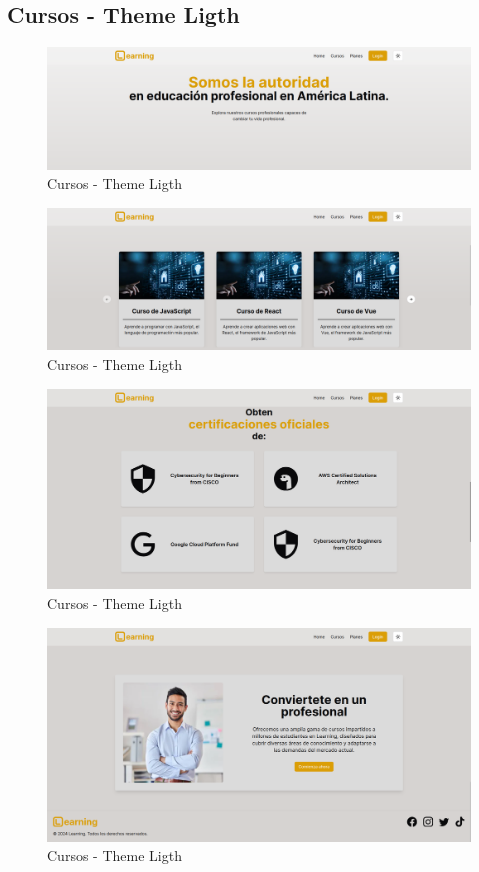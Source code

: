 \subsection{Cursos - Theme Ligth}
  \begin{figure}[H]
    \centering
    \includegraphics[width=1.0\textwidth]{img/C-L1.png}
    \caption{Cursos - Theme Ligth}
  \end{figure}
  \begin{figure}[H]
    \centering
    \includegraphics[width=1.0\textwidth]{img/C-L2.png}
    \caption{Cursos - Theme Ligth}
  \end{figure}
  \begin{figure}[H]
    \centering
    \includegraphics[width=1.0\textwidth]{img/C-L3.png}
    \caption{Cursos - Theme Ligth}
  \end{figure}
  \begin{figure}[H]
    \centering
    \includegraphics[width=1.0\textwidth]{img/C-L4.png}
    \caption{Cursos - Theme Ligth}
  \end{figure}










